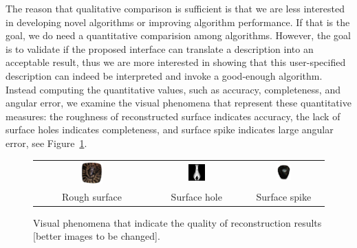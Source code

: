 The reason that qualitative comparison is sufficient is that we are less interested in developing novel algorithms or improving algorithm performance. If that is the goal, we do need a quantitative comparision among algorithms. However, the goal is to validate if the proposed interface can translate a description into an acceptable result, thus we are more interested in showing that this user-specified description can indeed be interpreted and invoke a good-enough algorithm. Instead computing the quantitative values, such as accuracy, completeness, and angular error, we examine the visual phenomena that represent these quantitative measures: the roughness of reconstructed surface indicates accuracy, the lack of surface holes indicates completeness, and surface spike indicates large angular error, see Figure~\ref{fig:vis_quality}.
\begin{figure}[!htbp]
\centering
\begin{tabular}{ccc}
\includegraphics[width=0.2\textwidth]{img/interp/real_interp/pot/pot_sc} &
\includegraphics[width=0.2\textwidth]{img/interp/synth_interp/vase0_sl} &
\includegraphics[width=0.2\textwidth]{img/interp/real_interp/vase/vase_ps} \\
Rough surface & Surface hole & Surface spike\\
\end{tabular}
\caption{Visual phenomena that indicate the quality of reconstruction results [better images to be changed].}
\label{fig:vis_quality}
\end{figure}


